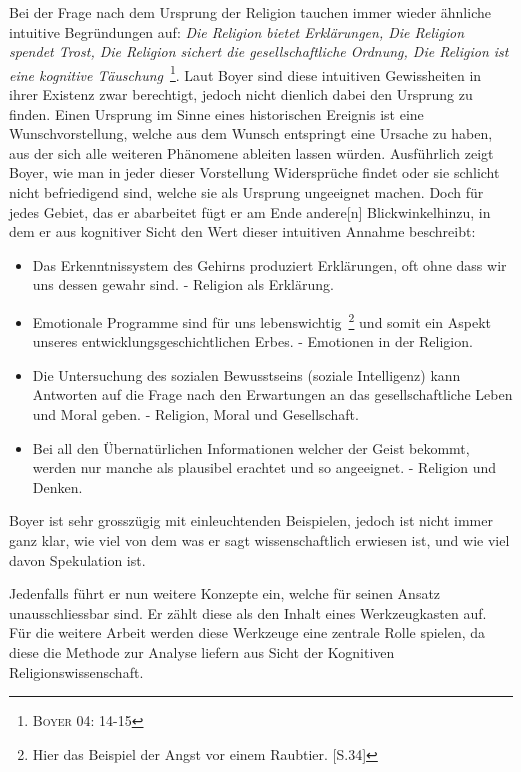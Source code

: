 Bei der Frage nach dem Ursprung der Religion tauchen immer wieder ähnliche intuitive Begründungen auf: \emph{Die Religion bietet Erklärungen, Die Religion spendet Trost, Die Religion sichert die gesellschaftliche Ordnung, Die Religion ist eine kognitive Täuschung}~\footnote{\textsc{Boyer 04: 14-15}}. Laut Boyer sind diese intuitiven Gewissheiten in ihrer Existenz zwar berechtigt, jedoch nicht dienlich dabei den Ursprung zu finden. Einen Ursprung im Sinne eines historischen Ereignis ist eine Wunschvorstellung, welche aus dem Wunsch entspringt eine Ursache zu haben, aus der sich alle weiteren Phänomene ableiten lassen würden. Ausführlich zeigt Boyer, wie man in jeder dieser Vorstellung Widersprüche findet oder sie schlicht nicht befriedigend sind, welche sie als Ursprung ungeeignet machen. Doch für jedes Gebiet, das er abarbeitet fügt er am Ende \glqq[einen] andere[n] Blickwinkel\grqq  hinzu, in dem er aus kognitiver Sicht den Wert dieser intuitiven Annahme beschreibt:

\begin{itemize}
	\item Das Erkenntnissystem des Gehirns produziert Erklärungen, oft ohne dass wir uns dessen gewahr sind. - Religion als Erklärung.
	\item Emotionale Programme sind für uns lebenswichtig~\footnote{Hier das Beispiel der Angst vor einem Raubtier. [S.34]} und somit ein Aspekt unseres entwicklungsgeschichtlichen Erbes. - Emotionen in der Religion.
	\item Die Untersuchung des sozialen Bewusstseins (soziale Intelligenz) kann Antworten auf die Frage nach den Erwartungen an das gesellschaftliche Leben und Moral geben. - Religion, Moral und Gesellschaft.
	\item Bei all den Übernatürlichen Informationen welcher der Geist bekommt, werden nur manche als plausibel erachtet und so angeeignet. - Religion und Denken.
\end{itemize}

Boyer ist sehr grosszügig mit einleuchtenden Beispielen, jedoch ist nicht immer ganz klar, wie viel von dem was er sagt wissenschaftlich erwiesen ist, und wie viel davon Spekulation ist. 

Jedenfalls führt er nun weitere Konzepte ein, welche für seinen Ansatz unausschliessbar sind. Er zählt diese als den Inhalt eines Werkzeugkasten auf. Für die weitere Arbeit werden diese Werkzeuge eine zentrale Rolle spielen, da diese die Methode zur Analyse liefern aus Sicht der Kognitiven Religionswissenschaft.

